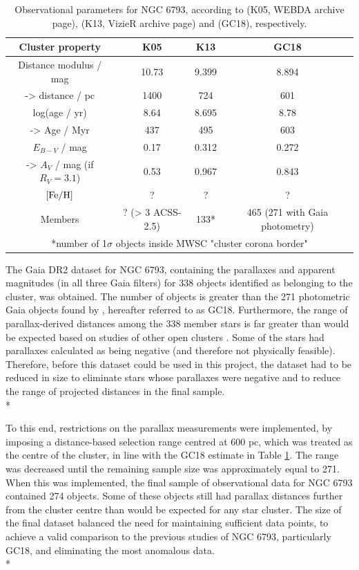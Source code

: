 \documentclass[12pt, a4paper]{report}
\begin{document}
\begin{table}
\begin{center}
\begin{tabular}{cccc}
\hline
Cluster property & K05 & K13 & GC18 \\
\hline
Distance modulus / mag & 10.73 & 9.399 & 8.894 \\
-> distance / pc & 1400 & 724 & 601 \\
log(age / yr) & 8.64 & 8.695 & 8.78 \\
-> Age / Myr & 437 & 495 & 603 \\
$E_{B-V}$ / mag & 0.17 & 0.312 & 0.272 \\
-> $A_{V}$ / mag (if $R_{V} = 3.1$) & 0.53 & 0.967 & 0.843 \\
$\textnormal{[Fe/H]}$ & ? & ? & ? \\
Members & ? (> 3 ACSS-2.5) & 133* & 465 (271 with Gaia photometry) \\
\hline
\multicolumn{4}{c}{*number of 1$\sigma$ objects inside MWSC "cluster corona border"} \\
\end{tabular}
\caption{Observational parameters for NGC 6793, according to \cite{2005A&A...438.1163K} (K05, WEBDA archive page), \cite{2013A&A...558A..53K} (K13, VizieR archive page) and \cite{2018A&A...616A..10G} (GC18), respectively.}
\label{NGC6793_obs}
\end{center}
\end{table}


The Gaia DR2 dataset for NGC 6793, containing the parallaxes and apparent magnitudes (in all three Gaia filters) for 338 objects identified as belonging to the cluster, was obtained. The number of objects is greater than the 271 photometric Gaia objects found by \cite{2018A&A...616A..10G}, hereafter referred to as GC18. Furthermore, the range of parallax-derived distances among the 338 member stars is far greater than would be expected based on studies of other open clusters \citep{2006A&A...456..523S}. Some of the stars had parallaxes calculated as being negative (and therefore not physically feasible). Therefore, before this dataset could be used in this project, the dataset had to be reduced in size to eliminate stars whose parallaxes were negative and to reduce the range of projected distances in the final sample. \\*

To this end, restrictions on the parallax measurements were implemented, by imposing a distance-based selection range centred at 600 pc, which was treated as the centre of the cluster, in line with the GC18 estimate in Table \ref{NGC6793_obs}. The range was decreased until the remaining sample size was approximately equal to 271. When this was implemented, the final sample of observational data for NGC 6793 contained 274 objects. Some of these objects still had parallax distances further from the cluster centre than would be expected for any star cluster. The size of the final dataset balanced the need for maintaining sufficient data points, to achieve a valid comparison to the previous studies of NGC 6793, particularly GC18, and eliminating the most anomalous data.\\*
\end{document}
